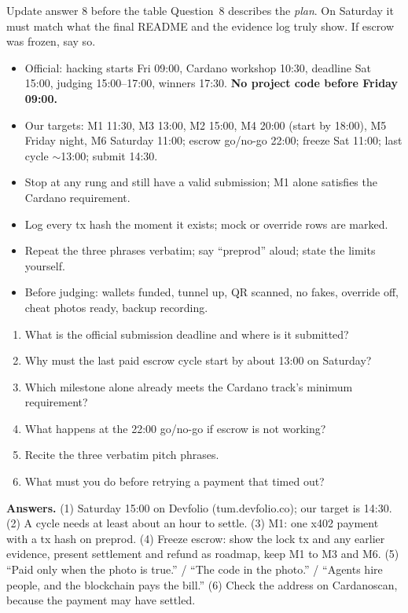 \begin{warningbox}{Update answer 8 before the table}
Question~8 describes the \emph{plan}. On Saturday it must match what the final README and the evidence log truly show. If escrow was frozen, say so.
\end{warningbox}

\begin{keypoints}
\begin{itemize}
  \item Official: hacking starts Fri 09:00, Cardano workshop 10:30, deadline Sat 15:00, judging 15:00--17:00, winners 17:30. \textbf{No project code before Friday 09:00.}
  \item Our targets: M1 11:30, M3 13:00, M2 15:00, M4 20:00 (start by 18:00), M5 Friday night, M6 Saturday 11:00; escrow go/no-go 22:00; freeze Sat 11:00; last cycle $\sim$13:00; submit 14:30.
  \item Stop at any rung and still have a valid submission; M1 alone satisfies the Cardano requirement.
  \item Log every tx hash the moment it exists; mock or override rows are marked.
  \item Repeat the three phrases verbatim; say ``preprod'' aloud; state the limits yourself.
  \item Before judging: wallets funded, tunnel up, QR scanned, no fakes, override off, cheat photos ready, backup recording.
\end{itemize}
\end{keypoints}

\begin{quizbox}
\begin{enumerate}
  \item What is the official submission deadline and where is it submitted?
  \item Why must the last paid escrow cycle start by about 13:00 on Saturday?
  \item Which milestone alone already meets the Cardano track's minimum requirement?
  \item What happens at the 22:00 go/no-go if escrow is not working?
  \item Recite the three verbatim pitch phrases.
  \item What must you do before retrying a payment that timed out?
\end{enumerate}
{\small\color{cGrey}\textbf{Answers.}
(1) Saturday 15:00 on Devfolio (tum.devfolio.co); our target is 14:30.
(2) A cycle needs at least about an hour to settle.
(3) M1: one x402 payment with a tx hash on preprod.
(4) Freeze escrow: show the lock tx and any earlier evidence, present settlement and refund as roadmap, keep M1 to M3 and M6.
(5) ``Paid only when the photo is true.'' / ``The code in the photo.'' / ``Agents hire people, and the blockchain pays the bill.''
(6) Check the address on Cardanoscan, because the payment may have settled.}
\end{quizbox}
